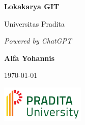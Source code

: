 \documentclass{book}
\begin{document}
	
	\begin{titlepage}
		\pagecolor[rgb]{0.800, 1, 0.800}
		\centering
		\vspace*{1cm}
		
		\Huge
		\textbf{Lokakarya GIT}
		
		\vspace{0.5cm}
			
		\LARGE
		Universitas Pradita
		
		\vspace{1.5cm}
		
		\textit{Powered by ChatGPT}
		
		\vspace{2cm}
		
		\textbf{Alfa Yohannis}
		
		\vspace{0.8cm}
		
		\today
		
				\vfill
		
		\begin{center}
			\includegraphics[width=0.3\textwidth]{images/logo_universitas}
		\end{center}
		

	\end{titlepage}

	 \afterpage{\nopagecolor}
	
	\tableofcontents
	
	
	
	
	
	
	
	
	
	
\end{document}
